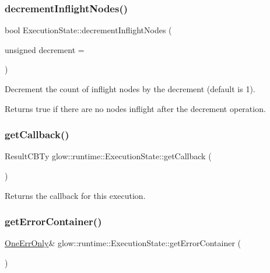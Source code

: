 \subsubsection{\texorpdfstring{decrement\+Inflight\+Nodes()}{decrementInflightNodes()}}
{\footnotesize\ttfamily bool Execution\+State\+::decrement\+Inflight\+Nodes (\begin{DoxyParamCaption}\item[{unsigned}]{decrement = {} }\end{DoxyParamCaption})}

Decrement the count of inflight nodes by the {\ttfamily decrement} (default is 1). \begin{DoxyReturn}{Returns}
true if there are no nodes inflight after the decrement operation. 
\end{DoxyReturn}
\mbox{\label{classglow_1_1runtime_1_1_execution_state_ab9f5585825bf7177a2607a7c2fd29247}} 
\subsubsection{\texorpdfstring{get\+Callback()}{getCallback()}}
{\footnotesize\ttfamily Result\+C\+B\+Ty glow\+::runtime\+::\+Execution\+State\+::get\+Callback (\begin{DoxyParamCaption}{ }\end{DoxyParamCaption})\hspace{0.3cm}{\ttfamily [inline]}}

\begin{DoxyReturn}{Returns}
the callback for this execution. 
\end{DoxyReturn}
\mbox{\label{classglow_1_1runtime_1_1_execution_state_ae3af7aa022ac86ebf86acd31b68decb5}} 
\subsubsection{\texorpdfstring{get\+Error\+Container()}{getErrorContainer()}}
{\footnotesize\ttfamily \hyperlink{classglow_1_1_one_err_only}{One\+Err\+Only}\& glow\+::runtime\+::\+Execution\+State\+::get\+Error\+Container (\begin{DoxyParamCaption}{ }\end{DoxyParamCaption})\hspace{0.3cm}{\ttfamily [inline]}}

